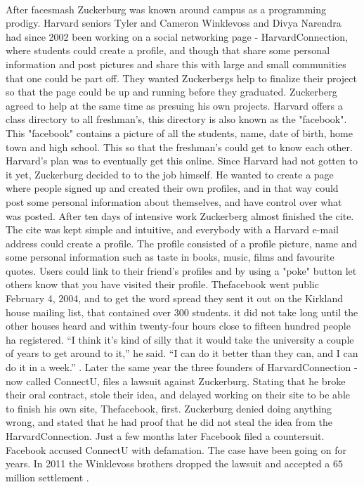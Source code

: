 \paragraph{}
After facesmash Zuckerburg was known around campus as a programming prodigy. Harvard seniors Tyler and Cameron Winklevoss and Divya Narendra had since 2002 been working on a social networking page - HarvardConnection, where students could create a profile, and though that share some personal information and post pictures and share this with large and small communities that one could be part off. They wanted Zuckerbergs help to finalize their project so that the page could be up and running before they graduated. Zuckerberg agreed to help at the same time as presuing his own projects. Harvard offers a class directory to all freshman's, this directory is also known as the "facebook". This "facebook" contains a picture of all the students, name, date of birth, home town and high school. This so that the freshman's could get to know each other. Harvard's plan was to eventually get this online. Since Harvard had not gotten to it yet,  Zuckerburg decided to to the job himself. He wanted to create a page where people signed up and created their own profiles, and in that way could post some personal information about themselves, and have control over what was posted. After ten days of intensive work Zuckerberg almost finished the cite. The cite was kept simple and intuitive, and everybody with a Harvard e-mail address could create a profile. The profile consisted of a profile picture, name and some personal information such as taste in books, music, films and favourite quotes. Users could link to their friend's profiles and by using a "poke" button let others know that you have visited their profile. Thefacebook went public February 4, 2004, and to get the word spread they sent it out on the Kirkland house mailing list, that contained over 300 students. it did not take long until the other houses heard and within twenty-four hours close to fifteen hundred people ha registered. “I think it’s kind of silly that it would take the university a couple of years to get around to it,” he said. “I can do it better than they can, and I can do it in a week.” \cite{MeMedia}. Later the same year the three founders of HarvardConnection -now called ConnectU, files a lawsuit against Zuckerburg. Stating that he broke their oral contract, stole their idea, and delayed working on their site to be able to finish his own site, Thefacebook, first. Zuckerburg denied doing anything wrong, and stated that he had proof that he did not steal the idea from the HarvardConnection. Just a few months later Facebook filed a countersuit. Facebook accused ConnectU with defamation. The case have been going on for years. In 2011 the Winklevoss brothers dropped the lawsuit and accepted a $ 65 $ million settlement \cite{droppLawsuit}.

